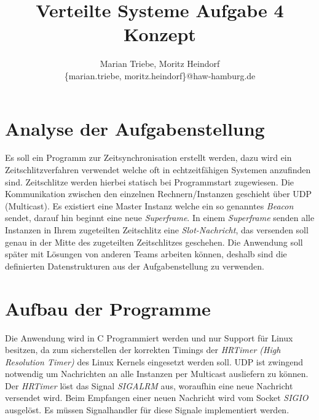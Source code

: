 \documentclass{article}
\begin{document}
\date{}

\title{Verteilte Systeme Aufgabe 4 Konzept}

\author{
  Marian Triebe, Moritz Heindorf\\
  \{marian.triebe, moritz.heindorf\}@haw-hamburg.de
}

\maketitle

\section{Analyse der Aufgabenstellung}
Es soll ein Programm zur Zeitsynchronisation erstellt werden, dazu wird ein Zeitschlitzverfahren verwendet welche oft in echtzeitfähigen Systemen anzufinden sind. Zeitschlitze werden hierbei statisch bei Programmstart zugewiesen. Die Kommunikation zwischen den einzelnen Rechnern/Instanzen geschieht über UDP (Multicast).
Es existiert eine Master Instanz welche ein so genanntes \textit{Beacon} sendet, darauf hin beginnt eine neue \textit{Superframe}. In einem \textit{Superframe} senden alle Instanzen in Ihrem zugeteilten Zeitschlitz eine \textit{Slot-Nachricht}, das versenden soll genau in der Mitte des zugeteilten Zeitschlitzes geschehen. Die Anwendung soll später mit Lösungen von anderen Teams arbeiten können, deshalb sind die definierten Datenstrukturen aus der Aufgabenstellung zu verwenden.

\section{Aufbau der Programme}
Die Anwendung wird in C Programmiert werden und nur Support für Linux besitzen, da zum sicherstellen der korrekten Timings der \textit{HRTimer (High Resolution Timer)} des Linux Kernels eingesetzt werden soll. UDP ist zwingend notwendig um Nachrichten an alle Instanzen per Multicast ausliefern zu können. Der \textit{HRTimer} löst das Signal \textit{SIGALRM} aus, woraufhin eine neue Nachricht versendet wird. Beim Empfangen einer neuen Nachricht wird vom Socket \textit{SIGIO} ausgelöst. Es müssen Signalhandler für diese Signale implementiert werden.
\end{document}
